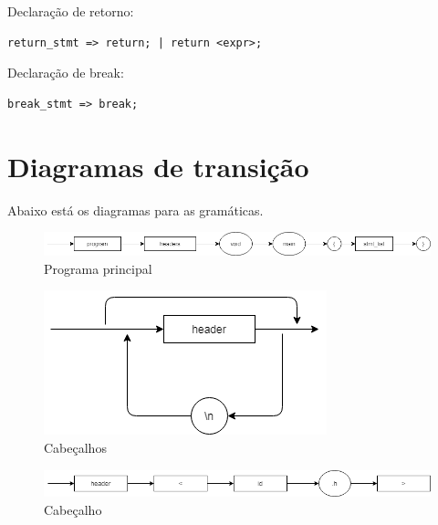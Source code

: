 \documentclass[]{article}
\numberwithin{equation}{section}
\begin{document}
Declaração de retorno:
\begin{lstlisting}
return_stmt => return; | return <expr>;
\end{lstlisting}

Declaração de break:
\begin{lstlisting}
break_stmt => break;
\end{lstlisting} 


\section{Diagramas de transição}

Abaixo está os diagramas para as gramáticas.

\begin{center}
\begin{figure}[h!]
  \includegraphics[width=\linewidth]{./assets/program.png}
  \caption{Programa principal}
\end{figure}
\end{center}

\begin{center}
\begin{figure}[h!]
  \includegraphics[width=\linewidth]{./assets/headers.png}
  \caption{Cabeçalhos}
\end{figure}
\end{center}

\begin{center}
\begin{figure}[h!]
  \includegraphics[width=\linewidth]{./assets/header.png}
  \caption{Cabeçalho}
\end{figure}
\end{center}
\end{document}
